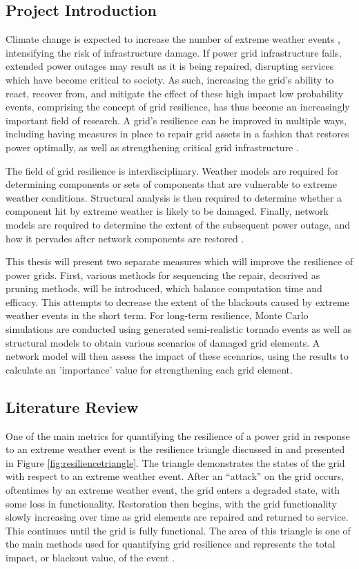 \documentclass[12pt]{article}
\begin{document}
\subsection{Project Introduction}
Climate change is expected to increase the number of extreme weather events \cite{cheng}, intensifying the risk of infrastructure damage. If power grid infrastructure fails, extended power outages may result as it is being repaired, disrupting services which have become critical to society. As such, increasing the grid’s ability to react, recover from, and mitigate the effect of these high impact low probability events, comprising the concept of grid resilience, has thus become an increasingly important field of research. A grid’s resilience can be improved in multiple ways, including having measures in place to repair grid assets in a fashion that restores power optimally, as well as strengthening critical grid infrastructure \cite{panteli}. \par
The field of grid resilience is interdisciplinary. Weather models are required for determining components or sets of components that are vulnerable to extreme weather conditions. Structural analysis is then required to determine whether a component hit by extreme weather is likely to be damaged. Finally, network models are required to determine the extent of the subsequent power outage, and how it pervades after network components are restored \cite{panteli}. \par
This thesis will present two separate measures which will improve the resilience of power grids. First, various methods for sequencing the repair, decsrived as pruning methods, will be introduced, which balance computation time and efficacy. This attempts to decrease the extent of the blackouts caused by extreme weather events in the short term. For long-term resilience, Monte Carlo simulations are conducted using generated semi-realistic tornado events as well as structural models to obtain various scenarios of damaged grid elements. A network model will then assess the impact of these scenarios, using the results to calculate an 'importance' value for strengthening each grid element.
\subsection{Literature Review} \label{LitReview}
One of the main metrics for quantifying the resilience of a power grid in response to an extreme weather event is the resilience triangle discussed in \cite{Jufri} and presented in Figure \ref{fig:resiliencetriangle}. The triangle demonstrates the states of the grid with respect to an extreme weather event. After an “attack” on the grid occurs, oftentimes by an extreme weather event, the grid enters a degraded state, with some loss in functionality.  Restoration then begins, with the grid functionality slowly increasing over time as grid elements are repaired and returned to service. This continues until the grid is fully functional. The area of this triangle is one of the main methods used for quantifying grid resilience and represents the total impact, or blackout value, of the event \cite{Jufri}.  \par
\end{document}
